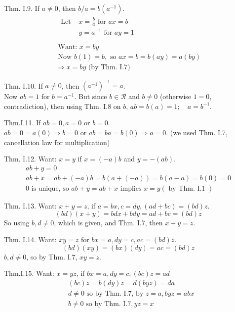 \documentclass[twoside]{amsart}
\theoremstyle{plain}
\theoremstyle{definition}
\begin{document}
Thm. I.9. If $a \neq 0$, then $b/a = b (a^{-1})$.   \\
\[
\begin{gathered}
  \begin{aligned}
    \text{ Let } & x = \frac{b}{a} \text{ for } ax = b \\
    & y = a^{-1} \text{ for } ay = 1 \\
  \end{aligned} \\
\text{ Want: } x = by \\
\text{ Now } b(1) = b, \text{ so } ax = b = b (ay) = a(by) \\
\Longrightarrow x = by \text{ (by Thm. I.7) }
\end{gathered}
\]

Thm. I.10.  If $a\neq 0$, then $(a^{-1})^{-1} = a $.  \\
Now $ab=1$ for $b=a^{-1}$.  But since $b \in \mathcal{R}$ and $b\neq 0$ (otherwise $1=0$, contradiction), then using Thm. I.8 on $b$, $ab= b(a) = 1 ; \quad a=b^{-1}$.  

Thm.I.11.  If $ab=0, a=0$ or $b=0$.  \\
$ab = 0 = a(0) \Longrightarrow b = 0$ or $ab = ba = b(0) \Longrightarrow a =0$.  (we used Thm. I.7, cancellation law for multiplication)

Thm. I.12.  Want: $x=y$ if $x = (-a)b$ and $y=-(ab)$.  \\
\[
\begin{gathered}
ab + y =0 \\
ab + x = ab + (-a)b = b(a+ (-a)) = b (a -a ) = b(0) = 0 \\
0 \text{ is unique, so } ab + y = ab + x \text{ implies } x = y (\text{ by Thm. I.1 } )
\end{gathered}
\]

Thm. I.13.  Want: $x + y =z$, if $a=bx, c=dy, (ad+bc) = (bd)z$.  
\[
(bd)(x+y) = bdx+bdy = ad +bc = (bd)z
\]
So using $b,d \neq 0$, which is given, and Thm. I.7, then $x+y=z$.  

Thm. I.14.  Want: $xy=z$ for $bx = a, dy=c, ac= (bd)z$.  
\[
(bd)(xy) = (bx)(dy) = ac = (bd)z
\]
$b, d \neq 0$, so by Thm. I.7, $xy=z$.  

Thm.I.15.  Want: $x = yz$, if $bx=a, dy=c, (bc)z = ad$
\[
\begin{aligned}
& (bc)z = b(dy)z = d(byz) = da \\
& d\neq 0 \text{ so by Thm. I.7, by } z = a, byz = a bx \\
& b \neq 0 \text{ so by Thm. I.7}, yz = x
\end{aligned}
\]
\end{document}
